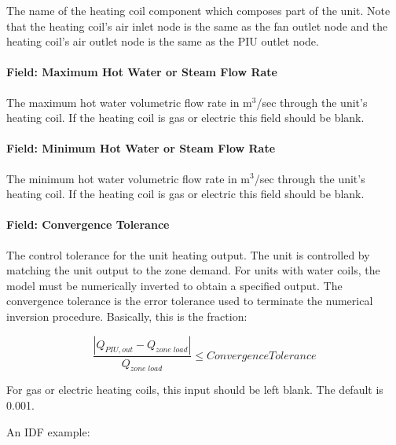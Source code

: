 The name of the heating coil component which composes part of the unit. Note that the heating coil's air inlet node is the same as the fan outlet node and the heating coil's air outlet node is the same as the PIU outlet node.

\paragraph{Field: Maximum Hot Water or Steam Flow Rate}\label{field-maximum-hot-water-or-steam-flow-rate-4}

The maximum hot water volumetric flow rate in m\(^{3}\)/sec through the unit's heating coil. If the heating coil is gas or electric this field should be blank.

\paragraph{Field: Minimum Hot Water or Steam Flow Rate}\label{field-minimum-hot-water-or-steam-flow-rate-4}

The minimum hot water volumetric flow rate in m\(^{3}\)/sec through the unit's heating coil. If the heating coil is gas or electric this field should be blank.

\paragraph{Field: Convergence Tolerance}\label{field-convergence-tolerance-3}

The control tolerance for the unit heating output. The unit is controlled by matching the unit output to the zone demand. For units with water coils, the model must be numerically inverted to obtain a specified output. The convergence tolerance is the error tolerance used to terminate the numerical inversion procedure. Basically, this is the fraction:

\begin{equation}
\frac{{\left| {{Q_{PIU,out}} - {Q_{zone\;load}}} \right|}}{{{Q_{zone\;load}}}} \le ConvergenceTolerance
\end{equation}

For gas or electric heating coils, this input should be left blank. The default is 0.001.

An IDF example:

